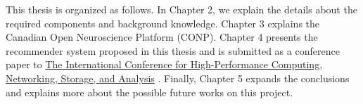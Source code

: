  


This thesis is organized as follows. In Chapter 2, we explain the details about the required components and background knowledge. Chapter 3 explains the Canadian Open Neuroscience Platform (CONP). Chapter 4 presents the recommender system proposed in this thesis and is submitted as a conference paper to \href{https://supercomputing.org/}{The International Conference for High-Performance Computing, Networking, Storage, and Analysis} . Finally, Chapter 5 expands the conclusions and explains more about the possible future works on this project.



